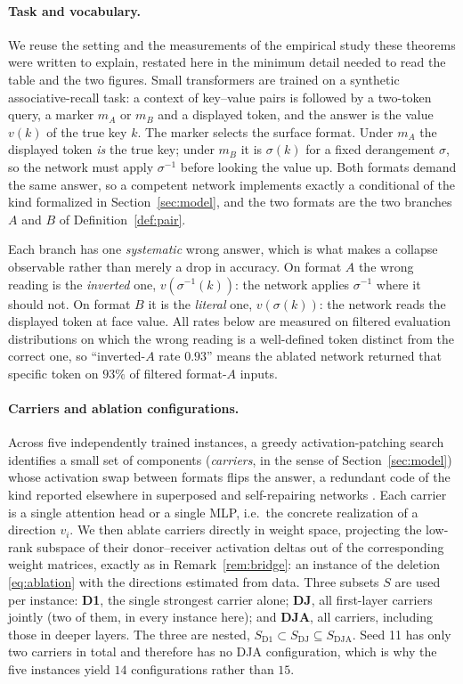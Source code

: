 \documentclass[11pt,a4paper]{article}
\begin{document}
\paragraph{Task and vocabulary.} We reuse the setting and the measurements of
the empirical study these theorems were written to explain, restated here in
the minimum detail needed to read the table and the two figures. Small
transformers are trained on a synthetic associative-recall task: a context of
key--value pairs is followed by a two-token query, a marker $m_A$ or $m_B$
and a displayed token, and the answer is the value $v(k)$ of the true key $k$.
The marker selects the surface format. Under $m_A$ the displayed token
\emph{is} the true key; under $m_B$ it is $\sigma(k)$ for a fixed derangement
$\sigma$, so the network must apply $\sigma^{-1}$ before looking the value up.
Both formats demand the same answer, so a competent network implements exactly
a conditional of the kind formalized in Section~\ref{sec:model}, and the two
formats are the two branches $A$ and $B$ of Definition~\ref{def:pair}.

Each branch has one \emph{systematic} wrong answer, which is what makes a
collapse observable rather than merely a drop in accuracy. On format $A$ the
wrong reading is the \emph{inverted} one, $v(\sigma^{-1}(k))$: the network
applies $\sigma^{-1}$ where it should not. On format $B$ it is the
\emph{literal} one, $v(\sigma(k))$: the network reads the displayed token
at face value. All rates below are measured on filtered evaluation
distributions on which the wrong reading is a well-defined token distinct from
the correct one, so ``inverted-$A$ rate $0.93$'' means the ablated network
returned that specific token on $93\%$ of filtered format-$A$ inputs.

\paragraph{Carriers and ablation configurations.} Across five independently
trained instances, a greedy activation-patching search identifies a small set
of components (\emph{carriers}, in the sense of Section~\ref{sec:model})
whose activation swap between formats flips the answer, a redundant code
of the kind reported elsewhere in superposed and self-repairing networks
\cite{elhage2022,mcgrath2023}. Each carrier is a single attention head or a
single MLP, i.e.\ the concrete realization of a direction $v_i$. We then
ablate carriers directly in weight space, projecting the low-rank subspace of
their donor--receiver activation deltas out of the corresponding weight
matrices, exactly as in Remark~\ref{rem:bridge}: an instance of the deletion
\eqref{eq:ablation} with the directions estimated from data. Three subsets
$S$ are used per instance: \textbf{D1}, the single strongest carrier alone;
\textbf{DJ}, all first-layer carriers jointly (two of them, in every instance
here); and \textbf{DJA}, all carriers, including those in deeper layers. The
three are nested, $S_{\mathrm{D1}}\subset S_{\mathrm{DJ}}\subseteq
S_{\mathrm{DJA}}$. Seed 11 has
only two carriers in total and therefore has no DJA configuration, which is
why the five instances yield $14$ configurations rather than $15$.
\end{document}
